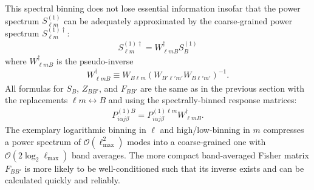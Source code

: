 \documentclass[prd,aps,twocolumn,nofootinbib,superscriptaddress,preprintnumbers,balancelastpage,longbibliography,floatfix]{revtex4-1}
\begin{document}
This spectral binning does not lose essential information insofar that the power spectrum $S^{(1)}_{\ell m}$ can be adequately approximated by the coarse-grained power spectrum $S^{(1)\dagger}_{\ell m}$:
\begin{align}
S^{(1)\dagger}_{\ell m} =  W_{\ell m B}^\dagger S_B^{(1)}
\end{align}
where $W_{\ell m B}^\dagger$ is the pseudo-inverse
\begin{align}
W_{\ell m B}^\dagger \equiv W_{B \ell m} \left( W_{B' \ell' m'} W_{B \ell' m'} \right)^{-1}.
\end{align}
All formulas for $S_B$, $Z_{B B'}$, and $F_{BB'}$ are the same as in the previous section with the replacements $\ell m \leftrightarrow B$ and using the spectrally-binned response matrices:
\begin{align}
P^{(1)B}_{i\alpha j \beta} = P^{(1)\ell m}_{i\alpha j \beta} W^\dagger_{\ell m B}. \label{eq:Pbinned}
\end{align}
The exemplary logarithmic binning in $\ell$ and high/low-binning in $m$ compresses a power spectrum of $\mathcal{O}(\ell_\mathrm{max}^2)$ modes into a coarse-grained one with $\mathcal{O}(2 \log_2 \ell_\mathrm{max})$ band averages. The more compact band-averaged Fisher matrix $F_{BB'}$ is more likely to be well-conditioned such that its inverse exists and can be calculated quickly and reliably.



\end{document}
